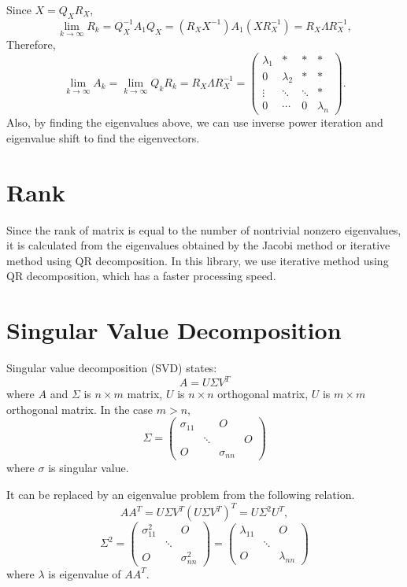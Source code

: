 \documentclass[dvipdfmx]{article}
\begin{document}
Since $X=Q_XR_X$,
$$
{\lim_{k{\rightarrow}{\infty}}} R_k = Q_X^{-1}A_1Q_X = (R_XX^{-1})A_1(XR_X^{-1}) = R_X{\Lambda}R_X^{-1},
$$
Therefore,
$$
{\lim_{k{\rightarrow}{\infty}}} A_k =
{\lim_{k{\rightarrow}{\infty}}} Q_kR_k =
R_X{\Lambda}R_X^{-1} =
\left(
\begin{array}{cccc}
{\lambda_1} & *           & *        & *           \\
0           & {\lambda_2} & *        & *           \\
\vdots      & {\ddots}    & {\ddots} & *           \\
0           & {\cdots}    & 0        & {\lambda_n}
\end{array}
\right).
$$
Also, by finding the eigenvalues above, we can use inverse power iteration and eigenvalue shift to find the eigenvectors.


\section*{Rank}
Since the rank of matrix is equal to the number of nontrivial nonzero eigenvalues, 
it is calculated from the eigenvalues obtained by the Jacobi method or iterative method using QR decomposition.
In this library, we use iterative method using QR decomposition, which has a faster processing speed.

 
\section*{Singular Value Decomposition}
Singular value decomposition (SVD) states:
$$
A = U {\Sigma} V^T
$$
where $A$ and ${\Sigma}$ is ${n{\times}m}$ matrix, $U$ is ${n{\times}n}$ orthogonal matrix, $U$ is ${m{\times}m}$ orthogonal matrix.
In the case $m > n$,
 \[
   {\Sigma} =
   \left(
   \begin{array}{ccc|c}
   {\sigma}_{11} & \            & O                    & \ \\
   \                      & {\ddots} & \                     & O \\
   O                    & \            & {\sigma}_{nn} & \
   \end{array}
   \right) 
  \] 
  where ${\sigma}$ is singular value.

It can be replaced by an eigenvalue problem from the following relation.
$$
AA^T = U {\Sigma} V^T  (U {\Sigma} V^T)^T = U{\Sigma}^2U^T ,
$$
 \[
   {\Sigma}^2 =
   \left(
   \begin{array}{ccc}
   {\sigma}_{11}^2 & \            & O \\
   \                         & {\ddots} & \   \\
   O                       & \            & {\sigma}_{nn}^2
   \end{array}
   \right) =
   \left(
   \begin{array}{ccc}
   {\lambda}_{11} & \            & O \\
   \                       & {\ddots} & \   \\
   O                     & \            & {\lambda}_{nn}
   \end{array}
   \right) 
  \] 
  where $\lambda$ is eigenvalue of $AA^T$.
 
\end{document}
